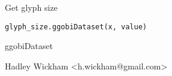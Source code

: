 \begin{Description}\relax
Get glyph size
\end{Description}
\begin{Usage}
\begin{verbatim}glyph_size.ggobiDataset(x, value)\end{verbatim}
\end{Usage}
\begin{Arguments}
\begin{ldescription}
\item[\code{x}] ggobiDataset
\item[\code{value}] 
\end{ldescription}
\end{Arguments}
\begin{Details}\relax
\end{Details}
\begin{Author}\relax
Hadley Wickham <h.wickham@gmail.com>
\end{Author}
\begin{SeeAlso}\relax
{}
\end{SeeAlso}
\begin{Examples}
\begin{ExampleCode}\end{ExampleCode}
\end{Examples}

